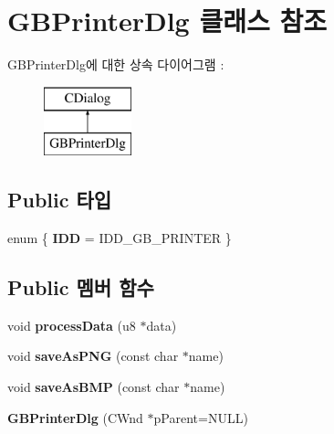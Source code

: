 \hypertarget{class_g_b_printer_dlg}{}\section{G\+B\+Printer\+Dlg 클래스 참조}
\label{class_g_b_printer_dlg}
G\+B\+Printer\+Dlg에 대한 상속 다이어그램 \+: \begin{figure}[H]
\begin{center}
\leavevmode
\includegraphics[height=2.000000cm]{class_g_b_printer_dlg}
\end{center}
\end{figure}
\subsection*{Public 타입}
\begin{DoxyCompactItemize}
\item 
\mbox{\label{class_g_b_printer_dlg_a1651cac3900d0c9e28bfdb591965155b}} 
enum \{ {\bfseries I\+DD} = I\+D\+D\+\_\+\+G\+B\+\_\+\+P\+R\+I\+N\+T\+ER
 \}
\end{DoxyCompactItemize}
\subsection*{Public 멤버 함수}
\begin{DoxyCompactItemize}
\item 
\mbox{\label{class_g_b_printer_dlg_a9dcd976e6386374b0f2c70af0b09a43e}} 
void {\bfseries process\+Data} (u8 $\ast$data)
\item 
\mbox{\label{class_g_b_printer_dlg_ad776132a614d5e3bec1567f38d9c5d9c}} 
void {\bfseries save\+As\+P\+NG} (const char $\ast$name)
\item 
\mbox{\label{class_g_b_printer_dlg_a49404740bed8928cf83d77acb9dcaf83}} 
void {\bfseries save\+As\+B\+MP} (const char $\ast$name)
\item 
\mbox{\label{class_g_b_printer_dlg_af449afffcd0cad3eb2fc1240a0aedf35}} 
{\bfseries G\+B\+Printer\+Dlg} (C\+Wnd $\ast$p\+Parent=N\+U\+LL)
\end{DoxyCompactItemize}
